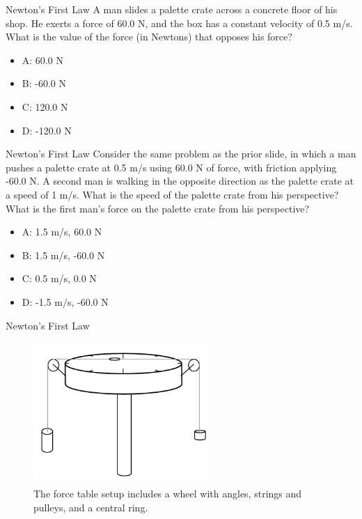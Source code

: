 \documentclass{beamer}
\begin{document}
\begin{frame}{Newton's First Law}
A man slides a palette crate across a concrete floor of his shop.  He exerts a force of 60.0 N, and the box has a constant velocity of 0.5 m/s.  What is the value of the force (in Newtons) that opposes his force?
\begin{itemize}
\item A: 60.0 N
\item B: -60.0 N
\item C: 120.0 N
\item D: -120.0 N
\end{itemize}
\end{frame}

\begin{frame}{Newton's First Law}
\small
Consider the same problem as the prior slide, in which a man pushes a palette crate at 0.5 m/s using 60.0 N of force, with friction applying -60.0 N.  A second man is walking in the opposite direction as the palette crate at a speed of 1 m/s.  What is the speed of the palette crate from his perspective?  What is the first man's force on the palette crate from his perspective?
\begin{itemize}
\item A: 1.5 m/s, 60.0 N
\item B: 1.5 m/s, -60.0 N
\item C: 0.5 m/s, 0.0 N 
\item D: -1.5 m/s, -60.0 N
\end{itemize}
\end{frame}

\begin{frame}{Newton's First Law}
\begin{figure}
\centering
\includegraphics[width=0.6\textwidth]{figures/Table.pdf}
\caption{\label{fig:table} The force table setup includes a wheel with angles, strings and pulleys, and a central ring.}
\end{figure}
\end{frame}
\end{document}
